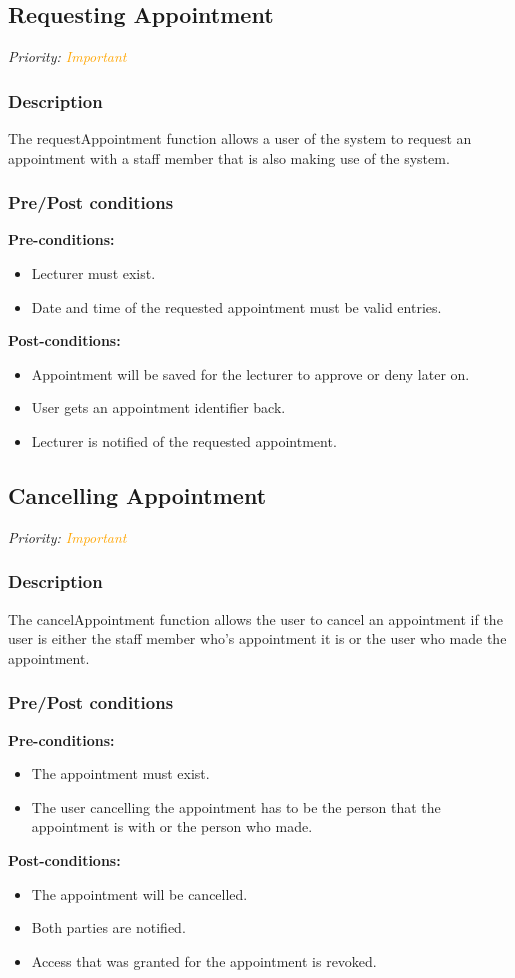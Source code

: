 \subsection{Requesting Appointment}
\textit{Priority: \textcolor{orange}{Important}} 

\subsubsection{ Description}
The requestAppointment function allows a user of the system to request an appointment with a staff member that is also making use of the system. 

\subsubsection{Pre/Post conditions}
\textbf{Pre-conditions:} 
	\begin{itemize}
		\item Lecturer must exist.
		\item Date and time of the requested appointment must be valid entries.
	\end{itemize}
\textbf{Post-conditions:} 
	\begin{itemize}
		\item Appointment will be saved for the lecturer to approve or deny later on.
		\item User gets an appointment identifier back.
		\item Lecturer is notified of the requested appointment. 
	\end{itemize}

\subsection{Cancelling Appointment}
\textit{Priority: \textcolor{orange}{Important}} 

\subsubsection{Description}
The cancelAppointment function allows the user to cancel an appointment if the user is either the staff member who's appointment it is or the user who made the appointment. 

\subsubsection{Pre/Post conditions}
\textbf{Pre-conditions:} 
	\begin{itemize}
		\item The appointment must exist.
		\item The user cancelling the appointment has to be the person that the appointment is with or the person who made.
	\end{itemize}
\textbf{Post-conditions:} 
	\begin{itemize}
		\item The appointment will be cancelled.
		\item  Both parties are notified.
		\item Access that was granted for the appointment is revoked. 
	\end{itemize}

